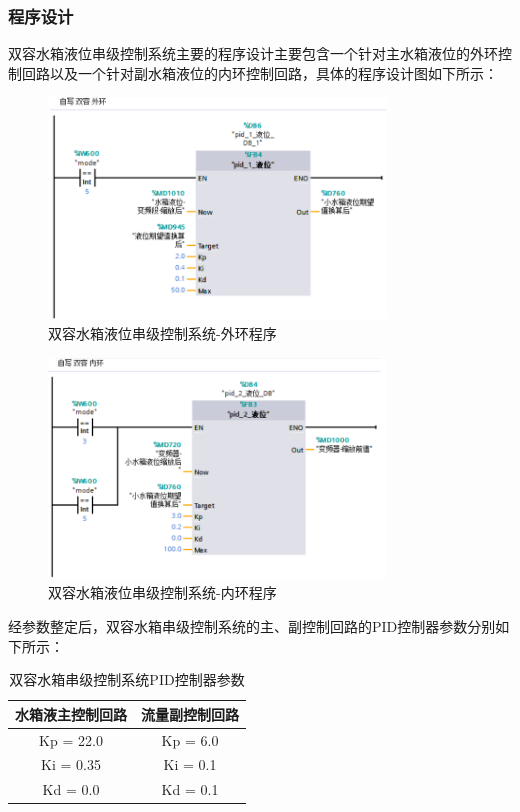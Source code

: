 \documentclass[UTF8]{article}
\begin{document}
\subsubsection{程序设计}
双容水箱液位串级控制系统主要的程序设计主要包含一个针对主水箱液位的外环控制回路以及一个针对副水箱液位的内环控制回路，具体的程序设计图如下所示：
\begin{figure}[H]
    \centering %
    \includegraphics[width=0.8\textwidth]{figure/双容-外环-自写.png} 
    \caption{双容水箱液位串级控制系统-外环程序} %
\end{figure}
\begin{figure}[H]
    \centering %
    \includegraphics[width=0.8\textwidth]{figure/双容-内环-自写.png} 
    \caption{双容水箱液位串级控制系统-内环程序} %
\end{figure}

经参数整定后，双容水箱串级控制系统的主、副控制回路的PID控制器参数分别如下所示：
\begin{table}[H] %
\centering %
\begin{tabular}{cc} %
	\toprule %
	水箱液主控制回路 & 流量副控制回路 \\
	\midrule %
	Kp = 22.0 &  Kp = 6.0\\
	Ki = 0.35 & Ki = 0.1 \\
	Kd = 0.0 & Kd = 0.1 \\
	\bottomrule %
\end{tabular}
\caption{双容水箱串级控制系统PID控制器参数} %
\end{table}
\end{document}

